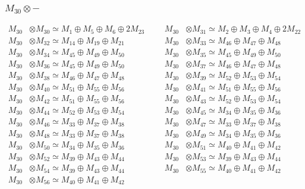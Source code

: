 \subsubsection{$ M_{30}\otimes -$}
\begin{align*}
M_{30} &\otimes M_{30} \simeq M_{1} \oplus M_{5} \oplus M_{6} \oplus 2M_{23} &&& M_{30} &\otimes M_{31} \simeq M_{2} \oplus M_{3} \oplus M_{4} \oplus 2M_{22}\\
M_{30} &\otimes M_{32} \simeq M_{14} \oplus M_{19} \oplus M_{21} &&& M_{30} &\otimes M_{33} \simeq M_{46} \oplus M_{47} \oplus M_{48}\\
M_{30} &\otimes M_{34} \simeq M_{45} \oplus M_{49} \oplus M_{50} &&& M_{30} &\otimes M_{35} \simeq M_{45} \oplus M_{49} \oplus M_{50}\\
M_{30} &\otimes M_{36} \simeq M_{45} \oplus M_{49} \oplus M_{50} &&& M_{30} &\otimes M_{37} \simeq M_{46} \oplus M_{47} \oplus M_{48}\\
M_{30} &\otimes M_{38} \simeq M_{46} \oplus M_{47} \oplus M_{48} &&& M_{30} &\otimes M_{39} \simeq M_{52} \oplus M_{53} \oplus M_{54}\\
M_{30} &\otimes M_{40} \simeq M_{51} \oplus M_{55} \oplus M_{56} &&& M_{30} &\otimes M_{41} \simeq M_{51} \oplus M_{55} \oplus M_{56}\\
M_{30} &\otimes M_{42} \simeq M_{51} \oplus M_{55} \oplus M_{56} &&& M_{30} &\otimes M_{43} \simeq M_{52} \oplus M_{53} \oplus M_{54}\\
M_{30} &\otimes M_{44} \simeq M_{52} \oplus M_{53} \oplus M_{54} &&& M_{30} &\otimes M_{45} \simeq M_{34} \oplus M_{35} \oplus M_{36}\\
M_{30} &\otimes M_{46} \simeq M_{33} \oplus M_{37} \oplus M_{38} &&& M_{30} &\otimes M_{47} \simeq M_{33} \oplus M_{37} \oplus M_{38}\\
M_{30} &\otimes M_{48} \simeq M_{33} \oplus M_{37} \oplus M_{38} &&& M_{30} &\otimes M_{49} \simeq M_{34} \oplus M_{35} \oplus M_{36}\\
M_{30} &\otimes M_{50} \simeq M_{34} \oplus M_{35} \oplus M_{36} &&& M_{30} &\otimes M_{51} \simeq M_{40} \oplus M_{41} \oplus M_{42}\\
M_{30} &\otimes M_{52} \simeq M_{39} \oplus M_{43} \oplus M_{44} &&& M_{30} &\otimes M_{53} \simeq M_{39} \oplus M_{43} \oplus M_{44}\\
M_{30} &\otimes M_{54} \simeq M_{39} \oplus M_{43} \oplus M_{44} &&& M_{30} &\otimes M_{55} \simeq M_{40} \oplus M_{41} \oplus M_{42}\\
M_{30} &\otimes M_{56} \simeq M_{40} \oplus M_{41} \oplus M_{42}
\end{align*}

